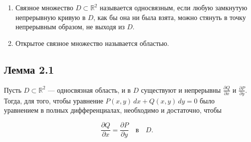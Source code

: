 {\begin{enumerate}
	\item Связное множество \( D \subset \mathbb{R}^2 \) называется односвязным, если любую замкнутую непрерывную кривую в \( D \), как бы она ни была взята, можно стянуть в точку непрерывным образом, не выходя из \( D \).
	
	\item Открытое связное множество называется областью.
	\end{enumerate}

	\subsection*{Лемма 2.1}

	Пусть \( D \subset \mathbb{R}^2 \) — односвязная область, и в \( D \) существуют и непрерывны \( \frac{\partial Q}{\partial x} \) и \( \frac{\partial P}{\partial y} \). Тогда, для того, чтобы уравнение \( P(x, y)\,dx + Q(x, y)\,dy = 0 \) было уравнением в полных дифференциалах, необходимо и достаточно, чтобы


	\[
	\frac{\partial Q}{\partial x} = \frac{\partial P}{\partial y} \quad \text{в} \quad D.
	\]

}
